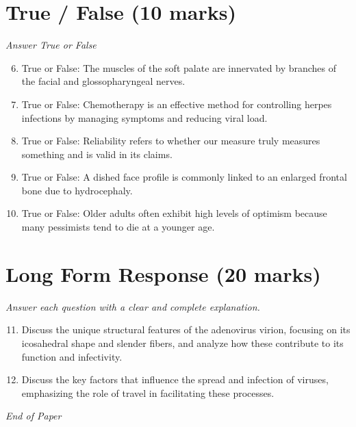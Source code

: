 \documentclass[12pt]{article}
\begin{document}
\section*{True / False (10 marks)}
\textit{Answer True or False}
\begin{enumerate}[label=\arabic*.]
\setcounter{enumi}{5}
\item True or False: The muscles of the soft palate are innervated by branches of the facial and glossopharyngeal nerves.
\item True or False: Chemotherapy is an effective method for controlling herpes infections by managing symptoms and reducing viral load.
\item True or False: Reliability refers to whether our measure truly measures something and is valid in its claims.
\item True or False: A dished face profile is commonly linked to an enlarged frontal bone due to hydrocephaly.
\item True or False: Older adults often exhibit high levels of optimism because many pessimists tend to die at a younger age.
\end{enumerate}

\section*{Long Form Response (20 marks)}
\textit{Answer each question with a clear and complete explanation.}
\begin{enumerate}[label=\arabic*.]
\setcounter{enumi}{10}
\item Discuss the unique structural features of the adenovirus virion, focusing on its icosahedral shape and slender fibers, and analyze how these contribute to its function and infectivity.
\item Discuss the key factors that influence the spread and infection of viruses, emphasizing the role of travel in facilitating these processes.
\end{enumerate}

\vfill
\noindent\textit{End of Paper}
\end{document}
